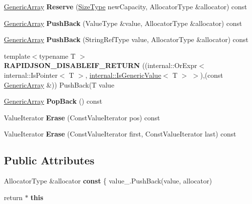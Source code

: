 \begin{DoxyCompactItemize}
\item 
\hyperlink{a00114}{Generic\+Array} {\bfseries Reserve} (\hyperlink{a00677_a5ed6e6e67250fadbd041127e6386dcb5}{Size\+Type} new\+Capacity, Allocator\+Type \&allocator) const \hypertarget{a00114_affe36316cbe3f80ece8a6fc45b777a58}{}\label{a00114_affe36316cbe3f80ece8a6fc45b777a58}

\item 
\hyperlink{a00114}{Generic\+Array} {\bfseries Push\+Back} (Value\+Type \&value, Allocator\+Type \&allocator) const \hypertarget{a00114_a6aad4336bb87edc9113f34a6d9073d53}{}\label{a00114_a6aad4336bb87edc9113f34a6d9073d53}

\item 
\hyperlink{a00114}{Generic\+Array} {\bfseries Push\+Back} (String\+Ref\+Type value, Allocator\+Type \&allocator) const \hypertarget{a00114_af583610a94a0fe360a5cbfd34fe8aa6c}{}\label{a00114_af583610a94a0fe360a5cbfd34fe8aa6c}

\item 
{\footnotesize template$<$typename T $>$ }\\{\bfseries R\+A\+P\+I\+D\+J\+S\+O\+N\+\_\+\+D\+I\+S\+A\+B\+L\+E\+I\+F\+\_\+\+R\+E\+T\+U\+RN} ((internal\+::\+Or\+Expr$<$ internal\+::\+Is\+Pointer$<$ T $>$, \hyperlink{a00184}{internal\+::\+Is\+Generic\+Value}$<$ T $>$ $>$),(const \hyperlink{a00114}{Generic\+Array} \&)) Push\+Back(T value\hypertarget{a00114_a12adff0c1e11aa3be6f4160015a65df0}{}\label{a00114_a12adff0c1e11aa3be6f4160015a65df0}

\item 
\hyperlink{a00114}{Generic\+Array} {\bfseries Pop\+Back} () const \hypertarget{a00114_a87a5a9acf7b26a81df42a54553bdbec4}{}\label{a00114_a87a5a9acf7b26a81df42a54553bdbec4}

\item 
Value\+Iterator {\bfseries Erase} (Const\+Value\+Iterator pos) const \hypertarget{a00114_a1d71be1384a0184514d9921d77b6a060}{}\label{a00114_a1d71be1384a0184514d9921d77b6a060}

\item 
Value\+Iterator {\bfseries Erase} (Const\+Value\+Iterator first, Const\+Value\+Iterator last) const \hypertarget{a00114_a105cb20275127cbd73fbc24e6af41dd1}{}\label{a00114_a105cb20275127cbd73fbc24e6af41dd1}

\end{DoxyCompactItemize}
\subsection*{Public Attributes}
\begin{DoxyCompactItemize}
\item 
Allocator\+Type \&allocator {\bfseries const} \{ value\+\_\+.\+Push\+Back(value, allocator)\hypertarget{a00114_a25d2ed55daa117c41db6a5b3f87e9ddc}{}\label{a00114_a25d2ed55daa117c41db6a5b3f87e9ddc}

\item 
return $\ast$ {\bfseries this}\hypertarget{a00114_aef8b7baa9ec5cd68d8951fa8bad85217}{}\label{a00114_aef8b7baa9ec5cd68d8951fa8bad85217}

\end{DoxyCompactItemize}
